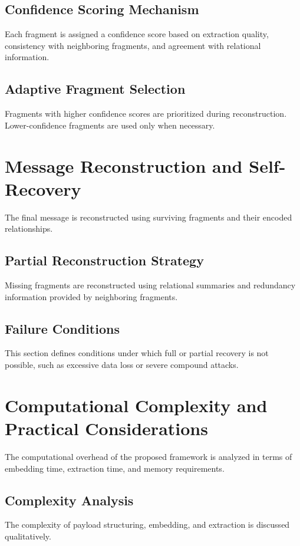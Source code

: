 \documentclass[12pt,a4paper,oneside]{report}
\begin{document}
	\subsection{Confidence Scoring Mechanism}
	Each fragment is assigned a confidence score based on extraction quality, consistency with neighboring fragments, and agreement with relational information.
	
	\subsection{Adaptive Fragment Selection}
	Fragments with higher confidence scores are prioritized during reconstruction. Lower-confidence fragments are used only when necessary.
	
	\section{Message Reconstruction and Self-Recovery}
	The final message is reconstructed using surviving fragments and their encoded relationships.
	
	\subsection{Partial Reconstruction Strategy}
	Missing fragments are reconstructed using relational summaries and redundancy information provided by neighboring fragments.
	
	\subsection{Failure Conditions}
	This section defines conditions under which full or partial recovery is not possible, such as excessive data loss or severe compound attacks.
	
	\section{Computational Complexity and Practical Considerations}
	The computational overhead of the proposed framework is analyzed in terms of embedding time, extraction time, and memory requirements.
	
	\subsection{Complexity Analysis}
	The complexity of payload structuring, embedding, and extraction is discussed qualitatively.
	
\end{document}

